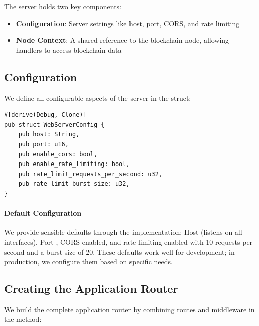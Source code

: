 The server holds two key components:

\begin{itemize}
  \item \textbf{Configuration}: Server settings like host, port, CORS, and rate limiting
  \item \textbf{Node Context}: A shared reference to the blockchain node, allowing handlers to access blockchain data
\end{itemize}

\subsection{Configuration}

We define all configurable aspects of the server in the  struct:

\begin{listing}[htbp]
\caption{WebServerConfig struct with sensible defaults}
\label{lst:webserver-config}
\begin{verbatim}
#[derive(Debug, Clone)]
pub struct WebServerConfig {
    pub host: String,
    pub port: u16,
    pub enable_cors: bool,
    pub enable_rate_limiting: bool,
    pub rate_limit_requests_per_second: u32,
    pub rate_limit_burst_size: u32,
}
\end{verbatim}
\end{listing}

\paragraph{Default Configuration}
We provide sensible defaults through the  implementation: Host  (listens on all interfaces), Port , CORS enabled, and rate limiting enabled with 10 requests per second and a burst size of 20. These defaults work well for development; in production, we configure them based on specific needs.

\subsection{Creating the Application Router}

We build the complete application router by combining routes and middleware in the  method:

